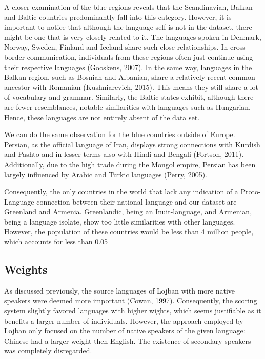 \vspace{0.3cm}

\noindent

A closer examination of the blue regions reveals that the Scandinavian, Balkan and Baltic countries predominantly fall into this category. However, it is important to notice that although the language self is not in the dataset, there might be one that is very closely related to it. The languages spoken in Denmark, Norway, Sweden, Finland and Iceland share such close relationships. In cross-border communication, individuals from these regions often just continue using their respective languages (Gooskens, 2007). In the same way, languages in the Balkan region, such as Bosnian and Albanian, share a relatively recent common ancestor with Romanian (Kushniarevich, 2015). This means they still share a lot of vocabulary and grammar. Similarly, the Baltic states exhibit, although there are fewer resemblances, notable similarities with languages such as Hungarian. Hence, these languages are not entirely absent of the data set.

We can do the same observation for the blue countries outside of Europe. Persian, as the official language of Iran, displays strong connections with Kurdish and Pashto and in lesser terms also with Hindi and Bengali (Fortson, 2011). Additionally, due to the high trade during the Mongol empire, Persian has been largely influenced by Arabic and Turkic languages (Perry, 2005). 

Consequently, the only countries in the world that lack any indication of a Proto-Language connection between their national language and our dataset are Greenland and Armenia. Greenlandic, being an Inuit-language, and Armenian, being a language isolate, show too little similarities with other languages. However, the population of these countries would be less than 4 million people, which accounts for less than 0.05%

\subsection{Weights}

As discussed previously, the source languages of Lojban with more native speakers were deemed more important (Cowan, 1997). Consequently, the scoring system slightly favored languages with higher wights, which seems justifiable as it benefits a larger number of individuals. However, the approach employed by Lojban only focused on the number of native speakers of the given language: Chinese had a larger weight then English. The existence of secondary speakers was completely disregarded. 

